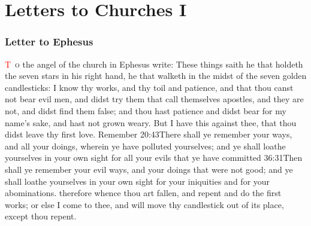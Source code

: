 \chapter{Letters to Churches I}
\subsection*{Letter to Ephesus}
\lettrine[lines=3]{\textcolor{red}{T}}{\ o} the angel of the church in Ephesus write:
\zz These things saith he that holdeth the seven stars in his right hand, he that walketh in the midst of the seven golden candlesticks:%
I know thy works, and thy toil and patience, and that thou canst not bear evil men, and didst try them that call themselves apostles, and they are not, and didst find them false; %
and thou hast patience and didst bear for my name’s sake, and hast not grown weary. %
But I have this against thee, that thou didst leave thy first love.%
Remember%
				{20:43}{There shall ye remember your ways, and all your doings, wherein ye have polluted yourselves; and ye shall loathe yourselves in your own sight for all your evils that ye have committed}%
				{36:31}{Then shall ye remember your evil ways, and your doings that were not good; and ye shall loathe yourselves in your own sight for your iniquities and for your abominations.} %
therefore whence thou art fallen, and repent and do the first works; or else I come to thee, and will move thy candlestick out of its place, except thou repent. %

